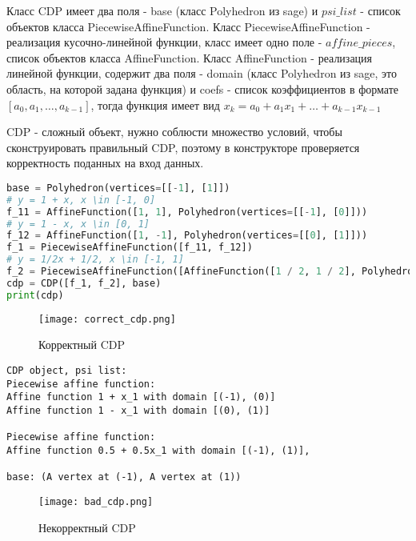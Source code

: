 \documentclass[fontsize=14pt]{scrartcl}
\theoremstyle{definition}
\begin{document}
Класс CDP имеет два поля - base (класс Polyhedron из sage) и $psi\_list$ - список объектов класса PiecewiseAffineFunction. 
Класс PiecewiseAffineFunction - реализация кусочно-линейной функции, класс имеет одно поле - $affine\_pieces$, список объектов класса AffineFunction. Класс AffineFunction - реализация линейной функции, содержит два поля - domain (класс Polyhedron из sage, это область, на которой задана функция) и coefs - список коэффициентов в формате $[a_0, a_1, \dots, a_{k-1}]$, тогда функция имеет вид $x_k = a_0 + a_1 x_1 + \dots + a_{k-1} x_{k-1}$

CDP - сложный объект, нужно соблюсти множество условий, чтобы сконструировать правильный CDP, поэтому в конструкторе проверяется корректность поданных на вход данных. 



\begin{lstlisting}[language=Python, label={correct}, style=python] 
base = Polyhedron(vertices=[[-1], [1]])
# y = 1 + x, x \in [-1, 0]
f_11 = AffineFunction([1, 1], Polyhedron(vertices=[[-1], [0]]))
# y = 1 - x, x \in [0, 1]
f_12 = AffineFunction([1, -1], Polyhedron(vertices=[[0], [1]]))
f_1 = PiecewiseAffineFunction([f_11, f_12])
# y = 1/2x + 1/2, x \in [-1, 1]
f_2 = PiecewiseAffineFunction([AffineFunction([1 / 2, 1 / 2], Polyhedron(vertices=[[-1], [1]]))])
cdp = CDP([f_1, f_2], base)
print(cdp)
\end{lstlisting}

\begin{figure}[h]
\centering
  \texttt{[image: correct\_cdp.png]}
  \caption{Корректный CDP}\label{correntcdp}
\end{figure}

\begin{lstlisting}[style=output]
CDP object, psi list:
Piecewise affine function:
Affine function 1 + x_1 with domain [(-1), (0)]
Affine function 1 - x_1 with domain [(0), (1)]

Piecewise affine function:
Affine function 0.5 + 0.5x_1 with domain [(-1), (1)],

base: (A vertex at (-1), A vertex at (1))
\end{lstlisting}

\begin{figure}[h]
\centering
  \texttt{[image: bad\_cdp.png]}
  \caption{Некорректный CDP}\label{correntcdp}
\end{figure}
\end{document}
